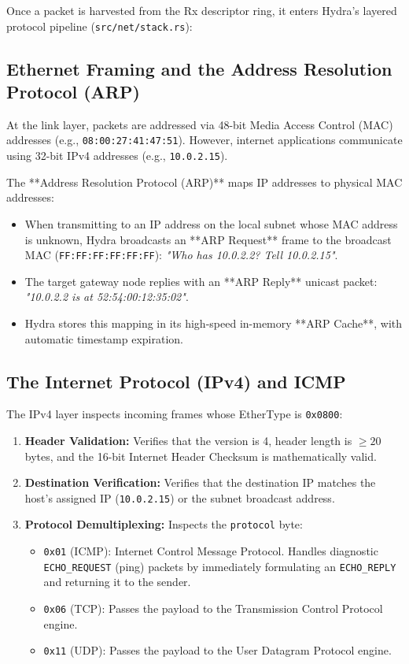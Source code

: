 Once a packet is harvested from the Rx descriptor ring, it enters Hydra's layered protocol pipeline (\texttt{src/net/stack.rs}):

\subsection{Ethernet Framing and the Address Resolution Protocol (ARP)}
At the link layer, packets are addressed via 48-bit Media Access Control (MAC) addresses (e.g., \texttt{08:00:27:41:47:51}). However, internet applications communicate using 32-bit IPv4 addresses (e.g., \texttt{10.0.2.15}).

The **Address Resolution Protocol (ARP)** maps IP addresses to physical MAC addresses:
\begin{itemize}
    \item When transmitting to an IP address on the local subnet whose MAC address is unknown, Hydra broadcasts an **ARP Request** frame to the broadcast MAC (\texttt{FF:FF:FF:FF:FF:FF}): \textit{"Who has 10.0.2.2? Tell 10.0.2.15"}.
    \item The target gateway node replies with an **ARP Reply** unicast packet: \textit{"10.0.2.2 is at 52:54:00:12:35:02"}.
    \item Hydra stores this mapping in its high-speed in-memory **ARP Cache**, with automatic timestamp expiration.
\end{itemize}

\subsection{The Internet Protocol (IPv4) and ICMP}
The IPv4 layer inspects incoming frames whose EtherType is \texttt{0x0800}:
\begin{enumerate}
    \item \textbf{Header Validation:} Verifies that the version is 4, header length is $\ge 20$ bytes, and the 16-bit Internet Header Checksum is mathematically valid.
    \item \textbf{Destination Verification:} Verifies that the destination IP matches the host's assigned IP (\texttt{10.0.2.15}) or the subnet broadcast address.
    \item \textbf{Protocol Demultiplexing:} Inspects the \texttt{protocol} byte:
    \begin{itemize}
        \item \texttt{0x01} (ICMP): Internet Control Message Protocol. Handles diagnostic \texttt{ECHO\_REQUEST} (ping) packets by immediately formulating an \texttt{ECHO\_REPLY} and returning it to the sender.
        \item \texttt{0x06} (TCP): Passes the payload to the Transmission Control Protocol engine.
        \item \texttt{0x11} (UDP): Passes the payload to the User Datagram Protocol engine.
    \end{itemize}
\end{enumerate}

